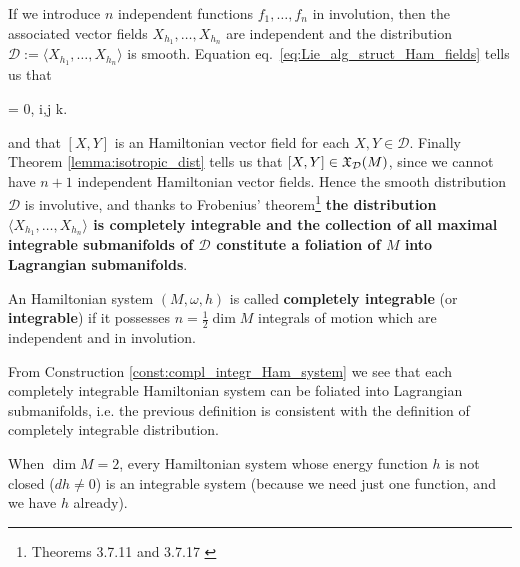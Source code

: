 \documentclass[main.tex]{subfiles}
\begin{document}
\begin{construction}
\label{const:compl_integr_Ham_system}
	If we introduce $n$ independent functions $f_1, \dots, f_n$ in involution, then the associated vector fields $X_{h_1}, \dots, X_{h_n}$ are independent and the distribution $\mathcal D := \langle X_{h_1}, \dots, X_{h_n} \rangle$ is smooth. Equation eq.~\eqref{eq:Lie_alg_struct_Ham_fields} tells us that 
	\begin{eqalign}
		[X_{h_i}, X_{h_j}] = 0, \quad \forall i,j \leq k.
	\end{eqalign}
	and that $[X, Y]$ is an Hamiltonian vector field for each $X, Y \in \mathcal D$. Finally Theorem \ref{lemma:isotropic_dist} tells us that $[X, Y] \in \mathfrak{X}_{\mathcal D}(M)$, since we cannot have $n+1$ independent Hamiltonian vector fields. Hence the smooth distribution $\mathcal D$ is involutive, and thanks to Frobenius' theorem\footnote{Theorems 3.7.11 and 3.7.17 \cite{abate2011geometria}} \textbf{the distribution $\langle X_{h_1}, \dots, X_{h_n} \rangle$ is completely integrable and the collection of all maximal integrable submanifolds of $\mathcal D$ constitute a foliation of $M$ into Lagrangian submanifolds}.
\end{construction}

\begin{definition}
	An Hamiltonian system $(M, \omega, h)$ is called \textbf{completely integrable} (or \textbf{integrable}) if it possesses $n=\frac12 \dim M$ integrals of motion which are independent and in involution.
\end{definition}

\begin{remark}
	From Construction \ref{const:compl_integr_Ham_system} we see that each completely integrable Hamiltonian system can be foliated into Lagrangian submanifolds, i.e. the previous definition is consistent with the definition of completely integrable distribution. 
\end{remark}

\begin{remark}
	When $\dim M=2$, every Hamiltonian system whose energy function $h$ is not closed ($dh \neq 0$) is an integrable system (because we need just one function, and we have $h$ already).
\end{remark}
\end{document}
